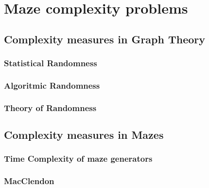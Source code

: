 \chapter{Maze complexity problems}\label{cha:background}
\section{Complexity measures in Graph Theory}
\subsection{Statistical Randomness}
\subsection{Algoritmic Randomness}
\subsection{Theory of Randomness}
\section{Complexity measures in Mazes}
\subsection{Time Complexity of maze generators}
\subsection{MacClendon}

